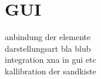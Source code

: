 \section{GUI}
\begin{Spacing}{\mylinespace}

anbindung der elemente \\
darstellungsart bla blub\\
integration xna in gui etc\\
kallibration der sandkiste\\


\end{Spacing}
\newpage
\clearpage
